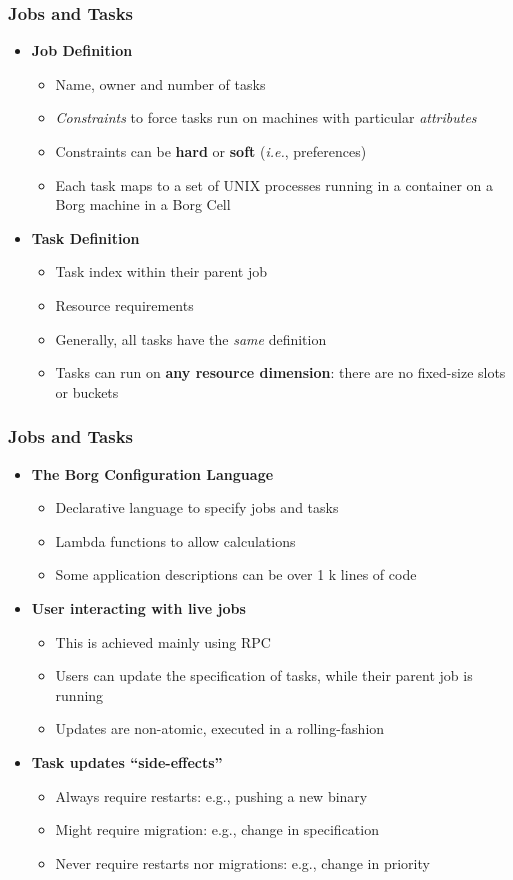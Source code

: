 \begin{frame}
\frametitle{Jobs and Tasks}
\begin{itemize}
	\item {\bf Job Definition}
	\begin{itemize}
		\item Name, owner and number of tasks
		\item {\it Constraints} to force tasks run on machines with particular {\it attributes}
		\item Constraints can be {\bf hard} or {\bf soft} ({\it i.e.}, preferences)
		\item Each task maps to a set of UNIX processes running in a container on a Borg machine in a Borg Cell
	\end{itemize}
	\item {\bf Task Definition}
	\begin{itemize}
		\item Task index within their parent job
		\item Resource requirements
		\item Generally, all tasks have the {\it same} definition
		\item Tasks can run on {\bf any resource dimension}: there are no fixed-size slots or buckets
	\end{itemize}
\end{itemize}
\end{frame}

\begin{frame}
\frametitle{Jobs and Tasks}

\begin{itemize}
	\item {\bf The Borg Configuration Language}
	\begin{itemize}
		\item Declarative language to specify jobs and tasks
		\item Lambda functions to allow calculations
		\item Some application descriptions can be over 1 k lines of code
	\end{itemize}
	\item {\bf User interacting with live jobs}
	\begin{itemize}
		\item This is achieved mainly using RPC
		\item Users can update the specification of tasks, while their parent job is running
		\item Updates are non-atomic, executed in a rolling-fashion
	\end{itemize}
	\item {\bf Task updates ``side-effects''}
	\begin{itemize}
		\item Always require restarts: e.g., pushing a new binary
		\item Might require migration: e.g., change in specification
		\item Never require restarts nor migrations: e.g., change in priority
	\end{itemize}
\end{itemize}
\end{frame}

